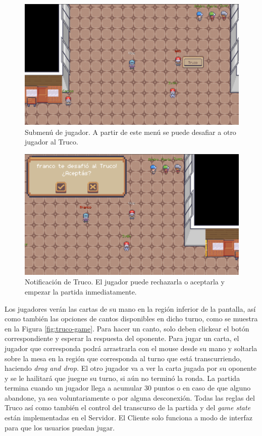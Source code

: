 \begin{figure}[htbp]
    \centering
    \includegraphics[width=1.0\textwidth]{../assets/godot-truco-menu.png}
    \caption{Submenú de jugador. A partir de este menú se puede desafiar a otro jugador al Truco.}
    \label{fig:truco-submenu}
\end{figure}

\begin{figure}[htbp]
    \centering
    \includegraphics[width=1.0\textwidth]{../assets/godot-truco-notification.png}
    \caption{Notificación de Truco. El jugador puede rechazarla o aceptarla y empezar la partida inmediatamente.}
    \label{fig:truco-notification}
\end{figure}

Los jugadores verán las cartas de su mano en la región inferior de la pantalla, así como también las opciones
de cantos disponibles en dicho turno, como se muestra en la Figura \ref{fig:truco-game}.
Para hacer un canto, solo deben clickear el botón correspondiente
y esperar la respuesta del oponente. Para jugar un carta, el jugador que corresponda podrá arrastrarla con el
mouse desde su mano y soltarla sobre la mesa en la región que corresponda al turno que está transcurriendo,
haciendo \textit{drag and drop}. El otro jugador va a ver la carta jugada por su oponente y se le hailitará
que juegue su turno, si aún no terminó la ronda.
La partida termina cuando un jugador llega a acumular 30 puntos o en caso de que alguno abandone, ya sea 
voluntariamente o por alguna desconexión.
Todas las reglas del Truco así como también el control del transcurso de la partida y del \textit{game state}
están implementadas en el Servidor. El Cliente solo funciona a modo de interfaz para que los
usuarios puedan jugar.

